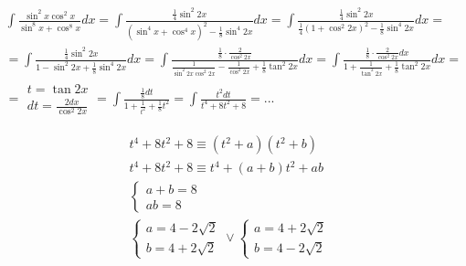 \begin{gather*}\int \frac{\sin^2 x \cos^2 x}{\sin^8 x + \cos^8 x}dx = \int \frac{\tfrac{1}{4} \sin^2 2 x}{ \left( \sin^4 x + \cos^4 x \right)^2 - \tfrac{1}{8} \sin^4 2x }dx = \int \frac{\tfrac{1}{4} \sin^2 2 x}{ \tfrac{1}{4} (1 + \cos^2 2x )^2 - \tfrac{1}{8} \sin^4 2x } dx =  \\
=  \int \frac{\tfrac{1}{4} \sin^2 2 x}{ 1 - \sin^2 2x + \tfrac{1}{8} \sin^4 2x }dx = \int \frac{\tfrac{1}{8} \cdot \frac{2}{\cos^2 2x}}{\tfrac{1}{\sin^2 2x \cos^2 2x} - \tfrac{1}{\cos^2 2x} + \tfrac{1}{8} \tan^2 2x}dx
= \int \frac{\tfrac{1}{8} \cdot \frac{2}{\cos^2 2x} dx}{1 + \tfrac{1}{\tan^2 2x} + \tfrac{1}{8} \tan^2 2x}dx =  \\
= \begin{array}{|l|} t=\tan 2x \\ dt=\frac{2dx}{\cos^{2}2x} \end{array} = \int \frac{\frac{1}{8}dt}{1+\frac{1}{t^2}+\frac{1}{8}t^2} = \int \frac{t^2dt}{t^4+8t^2+8}=...\end{gather*}

\begin{gather*}\nonumber t^4+8t^2+8 \equiv (t^2+a)(t^2+b) \\
t^4+8t^2+8 \equiv t^4+(a+b)t^2+ab \\
\begin{cases} a+b=8 \\ ab=8 \end{cases} \\
\begin{cases} a=4-2\sqrt{2} \\ b=4+2\sqrt{2} \end{cases} \vee \begin{cases} a=4+2\sqrt{2} \\ b=4-2\sqrt{2} \end{cases}\end{gather*}

